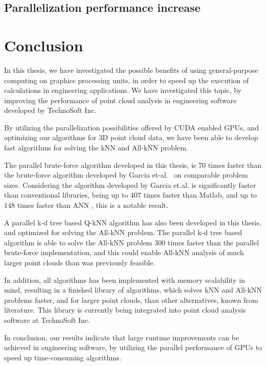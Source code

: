 \subsection{Parallelization performance increase} %
\label{sub:parallelization_performance_increase}
 


\section{Conclusion} %
\label{sec:conclusion}

In this thesis, we have investigated the possible benefits of using general-purpose computing on graphics processing units, in order to speed up the execution of calculations in engineering applications. We have investigated this topic, by improving the performance of point cloud analysis in engineering software developed by TechnoSoft Inc.

By utilizing the parallelization possibilities offered by CUDA enabled GPUs, and optimizing our algorithms for 3D point cloud data, we have been able to develop fast algorithms for solving the kNN and All-kNN problem.

The parallel brute-force algorithm developed in this thesis, is $70$ times faster than the brute-force algorithm developed by Garcia et-al\@.~\cite{Garcia2008} on comparable problem sizes. Considering the algorithm developed by Garcia et.al\@. is significantly faster than conventional libraries, being up to $407$ times faster than Matlab, and up to $148$ times faster than ANN \citep[Table 1]{Garcia2008}, this is a notable result.

A parallel k-d tree based Q-kNN algorithm has also been developed in this thesis, and optimized for solving the All-kNN problem. The parallel k-d tree based algorithm is able to solve the All-kNN problem $300$ times faster than the parallel brute-force implementation, and this could enable All-kNN analysis of much larger point clouds than was previously feasible.

In addition, all algorithms has been implemented with memory scalability in mind, resulting in a finished library of algorithms, which solves kNN and All-kNN problems faster, and for larger point clouds, than other alternatives, known from literature. This library is currently being integrated into point cloud analysis software at TechnoSoft Inc.

In conclusion, our results indicate that large runtime improvements can be achieved in engineering software, by utilizing the parallel performance of GPUs to speed up time-consuming algorithms.

